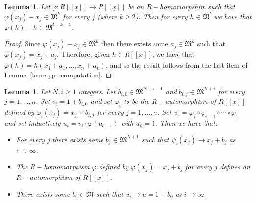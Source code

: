 \documentclass{article}
\newtheorem{lemma}[theorem]{Lemma}
\numberwithin{theorem}{section}
\begin{document}
\begin{lemma}\label{lem:app_fixpt}
    Let $\varphi \colon R[[\underline{x}]] \to R[[\underline{x}]]$ be an $R-$homomorpshim such that $\varphi(x_j) - x_j \in \mathfrak{M}^k$ for every $j$ (where $k \geq 2$). Then for every $h \in \mathfrak{M}^l$ we have that $\varphi(h)-h \in \mathfrak{M}^{l+k-1}$. 
\end{lemma}

\begin{proof}
    Since $\varphi(x_j) - x_j \in \mathfrak{M}^k$ then there exists some $a_j \in \mathfrak{M}^k$ such that $\varphi(x_j)=x_j+a_j$. Therefore, given $h \in R[[\underline{x}]]$, we have that $\varphi(h)=h(x_1+a_1, \dots, x_n + a_n)$, and so the result follows from the last item of Lemma~\ref{lem:app_computation}. 
\end{proof}


\begin{lemma}\label{lem:app_const}
Let $N,i \geq 1$ integers. Let $b_{i,0} \in \mathfrak{M}^{N+i-1}$ and $b_{i,j} \in \mathfrak{M}^{N+i}$ for every $j = 1, \dots, n$. Set $v_i = 1 +b_{i,0}$ and set $\varphi_i$ to be the $R-$automorphism of $R[[\underline{x}]]$ defined by $\varphi_i(x_j)=x_j+b_{i,j}$ for every $j = 1, \dots, n$. Set $\psi_i=\varphi_{i} \circ \varphi_{i-1} \circ \cdots \circ \varphi_1$ and set inductively $u_i = v_i \cdot \varphi(u_{i-1})$ with $u_0=1$. Then we have that:
\begin{itemize}
    \item For every $j$ there exists some $b_j \in \mathfrak{M}^{N+1}$ such that $\psi_i(x_j) \to x_j+b_j$ as $i \to \infty$. 
    \item The $R-$homomorphism $\varphi$ defined by $\varphi(x_j) = x_j+b_j$ for every $j$ defines an $R-$automorphism of $R[[\underline{x}]]$. 
    \item There exists some $b_0 \in \mathfrak{M}$ such that $u_i \to u=1+b_0$ as $i \to \infty$. 
\end{itemize}
\end{lemma}
\end{document}
